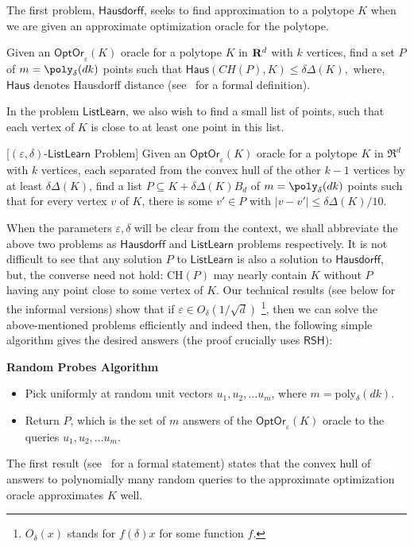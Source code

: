 \documentclass[11pt,letterpaper]{article}
\newcommand{\Haus}{{\mathsf{Haus}}}
\newcommand{\rsh}{{\mathsf {RSH}}\xspace}
\newcommand{\ListLearn}{\mathsf {ListLearn}\xspace}
\newcommand{\Hausdorf}{\mathsf {Hausdorff}\xspace }
\newcommand{\opto}{{\mathsf{OptOr}}}
\begin{document}
The first problem, $\Hausdorf$, seeks to find approximation to a polytope $K$ when we are given an approximate optimization oracle for the polytope. 
\begin{defn}[$(\varepsilon,\delta)$-$\Hausdorf$-Problem]
\label{Hausdorf-problem}
Given an  $\opto_\varepsilon(K)$ oracle for a polytope $K$ in ${\bf R}^d$ with $k$ vertices, find a set $P$ of $m=\poly_\delta(dk)$ points such that $\Haus(CH(P),K)\leq \delta\Delta(K),$
where, $\Haus$ denotes Hausdorff distance (see~ for a formal definition).    
\end{defn}

In the problem $\ListLearn$, we also wish to find a small list of points, such that each vertex of $K$ is close to at least one point in this list. 
\begin{defn}\label{LL}[$(\varepsilon,\delta)$-$\ListLearn$ Problem]
Given an $\opto_\varepsilon(K)$ oracle for a polytope $K$ in $\Re^d$ with $k$ vertices, each separated from the convex hull of the other $k-1$ vertices by at least $\delta\Delta(K)$, find a list $P\subseteq K+\delta \Delta(K) B_d$ of $m=\poly_\delta(dk)$ points 
such that for every vertex $v$ of $K$, there is some $v'\in P$ with $|v-v'|\leq\delta\Delta(K)/10.$
\end{defn}

When the parameters $\varepsilon, \delta$ will be clear from the context, we shall abbreviate the above two problems as $\Hausdorf$ and $\ListLearn$ problems respectively. It is not difficult to see that any solution $P$ to $\ListLearn$ is also a solution to $\Hausdorf$, but, the converse need not hold: CH$(P)$ may nearly contain $K$ without $P$ having any point close to some vertex of $K$. 
%
Our technical results (see below for the informal versions)
show that if $\varepsilon\in O_\delta(1/\sqrt d)$ \footnote{$O_\delta(x)$ stands for $f(\delta)x$ for some function $f$.}, then we can solve the above-mentioned problems efficiently  and indeed then, the following simple algorithm gives the desired answers (the proof crucially uses $\rsh$): 
\begin{framed}
{\bf  Random Probes Algorithm}
\begin{itemize}
    \item Pick uniformly at random unit vectors $u_1,u_2,\ldots u_m$, where $m=$poly$_\delta(dk)$.
    \item Return $P$, which is the set of $m$ answers of the $\opto_\varepsilon(K)$ oracle to the queries $u_1,u_2,\ldots u_m$. 
\end{itemize}
\end{framed}
The first result (see~ for a formal statement) states that the convex hull of answers to polynomially many random queries to the approximate optimization oracle approximates $K$ well. 
\end{document}
